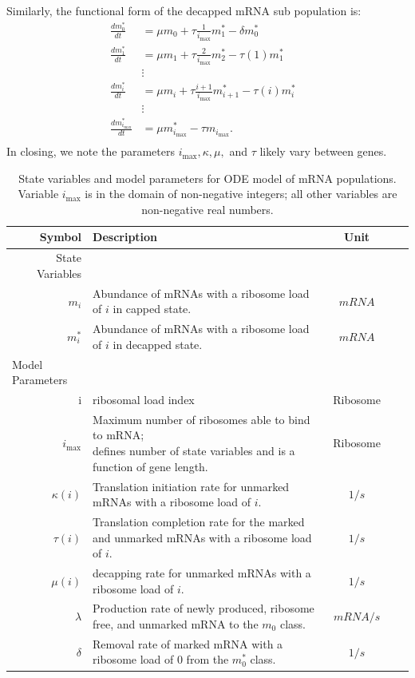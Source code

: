 \documentclass[review]{elsarticle}
\newcommand{\imax}{\ensuremath{{i_{\max}}}\xspace}
\begin{document}
Similarly, the functional form of the decapped mRNA sub population is: 
\begin{align}\label{eq:Decapped_ODE}
\frac{dm_{0}^{*}}{dt} &= \mu m_{0}+ \tau \frac{1}{\imax}m_{1}^{*}-\delta m_{0}^{*} \\ \nonumber
\frac{dm_{1}^{*}}{dt} &= \mu m_{1}+ \tau \frac{2}{\imax}m_{2}^{*}-\tau(1)m_{1}^{*} \\ \nonumber
& \vdots & \\ \nonumber
\frac{dm_{i}^{*}}{dt} &= \mu m_{i}+ \tau \frac{i+1}{\imax}m_{i+1}^{*}-\tau(i)m_{i}^{*} \\ \nonumber
& \vdots & \\ \nonumber
\frac{dm_{\imax}^{*}}{dt} &= \mu m_{\imax}^{*}- \tau m_{\imax}. \\ \nonumber
\end{align}
In closing, we note the parameters $\imax, \kappa, \mu,$ and $\tau$ likely vary between genes.

\begin{table}
\centering
\begin{tabular}{|rp{4in}|c|c|c|}\hline
\textbf{Symbol}&\textbf{Description}&\textbf{Unit} \\\hline
State Variables & &  \\ \hline
$m_i$ & Abundance of mRNAs with a ribosome load of $i$ in capped state. & $mRNA$ \\
$m_i^*$ & Abundance of mRNAs with a ribosome load of $i$ in decapped state. & $mRNA$ \\ \hline
\multicolumn{1}{l}{Model Parameters} \\ \hline
i & ribosomal load index & Ribosome\\
  \imax & \shortstack{Maximum number of ribosomes able to bind to mRNA;\\
           defines number of state variables and is a function of gene length.} & Ribosome \\
$\kappa(i)$ & Translation initiation rate for unmarked mRNAs with a ribosome load of $i$. & $1/s$\\
$\tau(i)$ & Translation completion rate for the marked and unmarked mRNAs with a ribosome load of $i$. & $1/s$\\
$\mu(i)$ & decapping rate for unmarked mRNAs with a ribosome load of $i$. & $1/s$\\
$\lambda$ & Production rate of newly produced, ribosome free, and unmarked mRNA to the $m_0$ class. & $mRNA/s$\\
$\delta$ & Removal rate of marked mRNA with a ribosome load of 0 from the $m_0^*$ class. & $1/s$\\ \hline 
\end{tabular}
\caption{State variables and model parameters for ODE model of mRNA populations.
Variable \imax is in the domain of non-negative integers; all other variables are non-negative real numbers.}
\label{tab:params}
\end{table}
\end{document}
